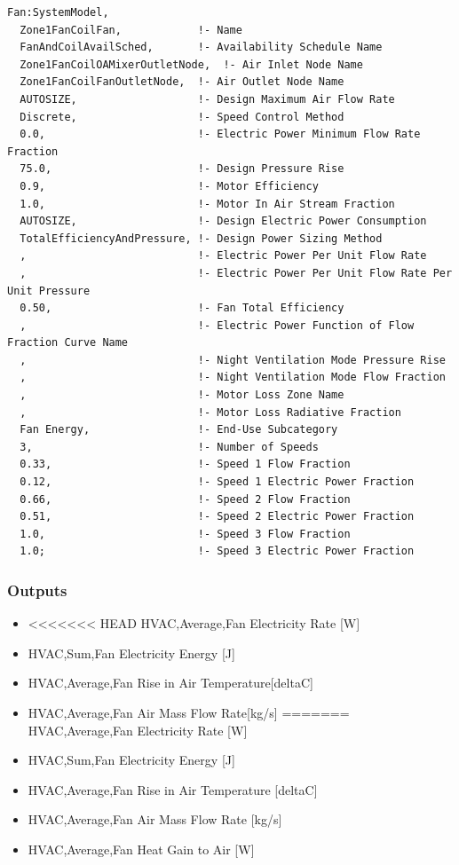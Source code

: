 \begin{lstlisting}
Fan:SystemModel,
  Zone1FanCoilFan,            !- Name
  FanAndCoilAvailSched,       !- Availability Schedule Name
  Zone1FanCoilOAMixerOutletNode,  !- Air Inlet Node Name
  Zone1FanCoilFanOutletNode,  !- Air Outlet Node Name
  AUTOSIZE,                   !- Design Maximum Air Flow Rate
  Discrete,                   !- Speed Control Method
  0.0,                        !- Electric Power Minimum Flow Rate Fraction
  75.0,                       !- Design Pressure Rise
  0.9,                        !- Motor Efficiency
  1.0,                        !- Motor In Air Stream Fraction
  AUTOSIZE,                   !- Design Electric Power Consumption
  TotalEfficiencyAndPressure, !- Design Power Sizing Method
  ,                           !- Electric Power Per Unit Flow Rate
  ,                           !- Electric Power Per Unit Flow Rate Per Unit Pressure
  0.50,                       !- Fan Total Efficiency
  ,                           !- Electric Power Function of Flow Fraction Curve Name
  ,                           !- Night Ventilation Mode Pressure Rise
  ,                           !- Night Ventilation Mode Flow Fraction
  ,                           !- Motor Loss Zone Name
  ,                           !- Motor Loss Radiative Fraction
  Fan Energy,                 !- End-Use Subcategory
  3,                          !- Number of Speeds
  0.33,                       !- Speed 1 Flow Fraction
  0.12,                       !- Speed 1 Electric Power Fraction
  0.66,                       !- Speed 2 Flow Fraction
  0.51,                       !- Speed 2 Electric Power Fraction
  1.0,                        !- Speed 3 Flow Fraction
  1.0;                        !- Speed 3 Electric Power Fraction
\end{lstlisting}

\subsubsection{Outputs}\label{outputs-fansysmodel}

\begin{itemize}
\item
<<<<<<< HEAD
HVAC,Average,Fan Electricity Rate {[}W{]}
\item
HVAC,Sum,Fan Electricity Energy {[}J{]}
\item
HVAC,Average,Fan Rise in Air Temperature{[}deltaC{]}
\item
HVAC,Average,Fan Air Mass Flow Rate{[}kg/s{]}
=======
  HVAC,Average,Fan Electricity Rate {[}W{]}
\item
  HVAC,Sum,Fan Electricity Energy {[}J{]}
\item
  HVAC,Average,Fan Rise in Air Temperature {[}deltaC{]}
\item
  HVAC,Average,Fan Air Mass Flow Rate {[}kg/s{]}
\item
  HVAC,Average,Fan Heat Gain to Air {[}W{]}
\end{itemize}

